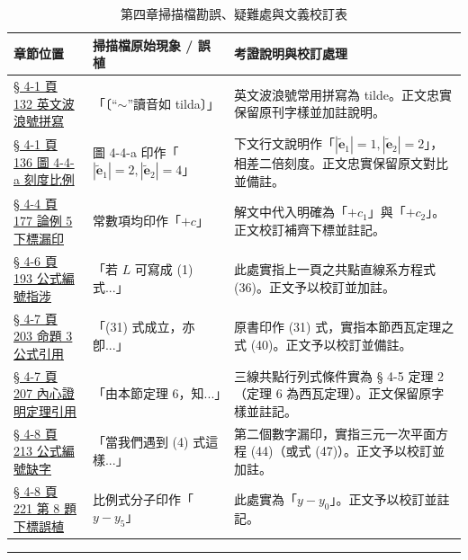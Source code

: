 \documentclass[a4paper,12pt,twoside]{article}
\begin{document}
\begin{table}[H]
\centering
\small
\renewcommand{\arraystretch}{1.35}
\begin{tabularx}{\textwidth}{|p{3.2cm}|p{3.8cm}|X|}
\hline
\textbf{章節位置} & \textbf{掃描檔原始現象 / 誤植} & \textbf{考證說明與校訂處理} \\ \hline

\hyperref[note:b3-ch4-p132-tilde-pronounce]{§ 4-1 頁 132 英文波浪號拼寫} & 
「〔“$\sim$”讀音如 tilda〕」 & 
英文波浪號常用拼寫為 tilde。正文忠實保留原刊字樣並加註說明。 \\ \hline

\hyperref[note:b3-ch4-p136-fig4-4-a-scale]{§ 4-1 頁 136 圖 4-4-a 刻度比例} & 
圖 4-4-a 印作「$|\tilde{\mathbf{e}}_1|=2, |\tilde{\mathbf{e}}_2|=4$」 & 
下文行文說明作「$|\tilde{\mathbf{e}}_1|=1, |\tilde{\mathbf{e}}_2|=2$」，相差二倍刻度。正文忠實保留原文對比並備註。 \\ \hline

\hyperref[note:b3-ch4-p177-l1-l2-subscripts]{§ 4-4 頁 177 論例 5 下標漏印} & 
常數項均印作「$+c$」 & 
解文中代入明確為「$+c_1$」與「$+c_2$」。正文校訂補齊下標並註記。 \\ \hline

\hyperref[note:b3-ch4-p193-formula-ref]{§ 4-6 頁 193 公式編號指涉} & 
「若 $L$ 可寫成 (1) 式...」 & 
此處實指上一頁之共點直線系方程式 (36)。正文予以校訂並加註。 \\ \hline

\hyperref[note:b3-ch4-p203-ceva-ref]{§ 4-7 頁 203 命題 3 公式引用} & 
「(31) 式成立，亦卽...」 & 
原書印作 (31) 式，實指本節西瓦定理之式 (40)。正文予以校訂並備註。 \\ \hline

\hyperref[note:b3-ch4-p207-theorem-ref]{§ 4-7 頁 207 內心證明定理引用} & 
「由本節定理 6，知...」 & 
三線共點行列式條件實為 § 4-5 定理 2（定理 6 為西瓦定理）。正文保留原字樣並註記。 \\ \hline

\hyperref[note:b3-ch4-p213-equation-ref]{§ 4-8 頁 213 公式編號缺字} & 
「當我們遇到 (4) 式這樣...」 & 
第二個數字漏印，實指三元一次平面方程 (44)（或式 (47)）。正文予以校訂並加註。 \\ \hline

\hyperref[note:b3-ch4-p221-subscript-typo]{§ 4-8 頁 221 第 8 題下標誤植} & 
比例式分子印作「$y - y_5$」 & 
此處實為「$y - y_0$」。正文予以校訂並註記。 \\ \hline
\end{tabularx}
\caption{第四章掃描檔勘誤、疑難處與文義校訂表}
\label{tab:errata_b3_ch4}
\end{table}

\vspace{1em}
\hrule
\vspace{1em}

\tableofcontents
\newpage

\setcounter{section}{3}

\end{document}
